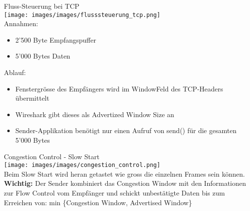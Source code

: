 \begin{example2}{Fluss-Steuerung bei TCP}\\
        \texttt{[image: images/images/flusssteuerung\_tcp.png]}\\
    Annahmen:
    \begin{itemize}
        \item 2'500 Byte Empfangspuffer
        \item 5'000 Bytes Daten
    \end{itemize}
    Ablauf:
    \begin{itemize}
        \item Fenstergrösse des Empfängers wird im WindowFeld des TCP-Headers übermittelt
        \item Wireshark gibt dieses als Advertized Window Size an
        \item Sender-Applikation benötigt nur einen Aufruf von send() für die gesamten 5'000 Bytes
    \end{itemize}
\end{example2}

\begin{concept}{Congestion Control - Slow Start}\\
    \texttt{[image: images/images/congestion\_control.png]}\\
    Beim Slow Start wird heran getastet wie gross die einzelnen Frames sein können.\\
    \textbf{Wichtig:} Der Sender kombiniert das Congestion Window mit den Informationen zur Flow Control vom Empfänger und schickt unbestätigte Daten bis zum Erreichen von: min \{Congestion Window, Advertised Window\}
\end{concept}

